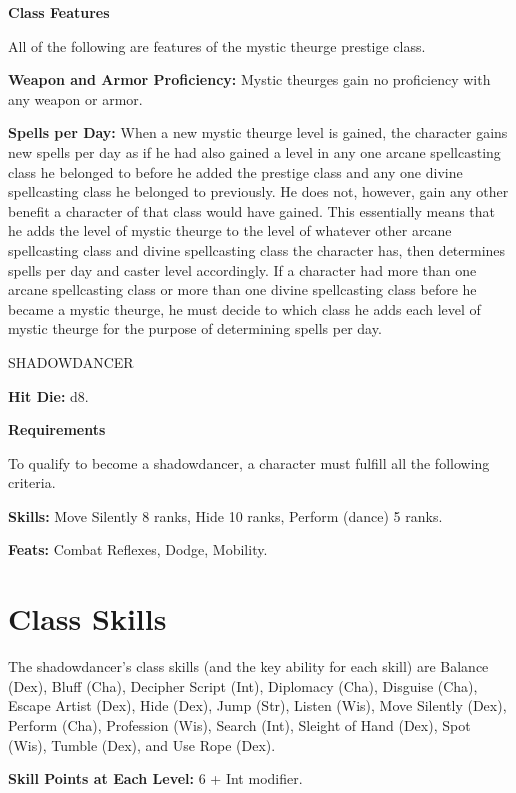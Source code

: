 \documentclass{article}
\begin{document}
\vspace{12pt}
\textbf{Class Features}

All of the following are features of the mystic theurge prestige class.

\textbf{Weapon and Armor Proficiency:} Mystic theurges gain no proficiency with 
any weapon or armor.

\textbf{Spells per Day: }When a new mystic theurge level is gained, the character 
gains new spells per day as if he had also gained a level in any one arcane spellcasting 
class he belonged to before he added the prestige class and any one divine spellcasting 
class he belonged to previously. He does not, however, gain any other benefit a 
character of that class would have gained. This essentially means that he adds 
the level of mystic theurge to the level of whatever other arcane spellcasting 
class and divine spellcasting class the character has, then determines spells per 
day and caster level accordingly. If a character had more than one arcane spellcasting 
class or more than one divine spellcasting class before he became a mystic theurge, 
he must decide to which class he adds each level of mystic theurge for the purpose 
of determining spells per day.

\vspace{12pt}
SHADOWDANCER

\textbf{Hit Die:} d8.

\textbf{Requirements}

To qualify to become a shadowdancer, a character must fulfill all the following 
criteria.

\textbf{Skills:} Move Silently 8 ranks, Hide 10 ranks, Perform (dance) 5 ranks.

\textbf{Feats:} Combat Reflexes, Dodge, Mobility. 

\section*{\textbf{Class Skills}}

The shadowdancer's class skills (and the key ability for each skill) are Balance 
(Dex), Bluff (Cha), Decipher Script (Int), Diplomacy (Cha), Disguise (Cha), Escape 
Artist (Dex), Hide (Dex), Jump (Str), Listen (Wis), Move Silently (Dex), Perform 
(Cha), Profession (Wis), Search (Int), Sleight of Hand (Dex), Spot (Wis), Tumble 
(Dex), and Use Rope (Dex). 

\parindent=3pt
\textbf{Skill Points at Each Level:} 6 + Int modifier.
\end{document}
